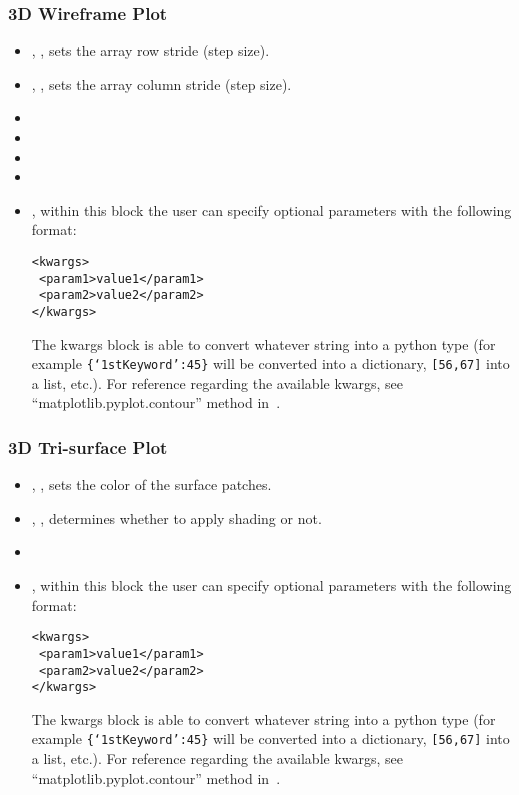 \subsubsection{3D Wireframe Plot}
\begin{itemize}
  \item {}, , sets the array row
  stride (step size).
  \item {}, , sets the array
  column stride (step size).
  \item {}
  \item {}
  \item {}
  \item {}
  \item {}, within this block the user can specify optional
  parameters with the following format:

\begin{lstlisting}[style=XML]
<kwargs>
 <param1>value1</param1>
 <param2>value2</param2>
</kwargs>
\end{lstlisting}

  The kwargs block is able to convert whatever string into a python type (for
  example \texttt{\{`1stKeyword':45\}} will
  be converted into a dictionary, 
  \texttt{[56,67]} into a list, etc.).
  For reference regarding the available kwargs, see
  ``matplotlib.pyplot.contour'' method in~\cite{MatPlotLib}.
\end{itemize}

\subsubsection{3D Tri-surface Plot}
\begin{itemize}
  \item {}, , sets the color of the
  surface patches.
  \item {}, , determines whether 
  to apply shading or not.
  \item {}
  \item {}, within this block the user can specify optional
  parameters with the following format:

\begin{lstlisting}[style=XML]
<kwargs>
 <param1>value1</param1>
 <param2>value2</param2>
</kwargs>
\end{lstlisting}

  The kwargs block is able to convert whatever string into a python type (for
  example \texttt{\{`1stKeyword':45\}} will
  be converted into a dictionary, 
  \texttt{[56,67]} into a list, etc.).
  For reference regarding the available kwargs, see
  ``matplotlib.pyplot.contour'' method in~\cite{MatPlotLib}.
\end{itemize}

